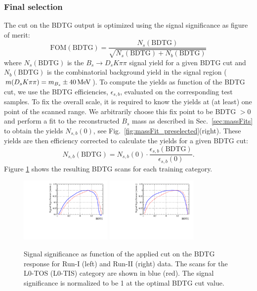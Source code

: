 \subsubsection{Final selection}

The cut on the BDTG output is optimized using the signal significance as figure of merit:
\begin{equation}
	\text{FOM}(\text{BDTG}) = \frac{N_s(\text{BDTG})}{\sqrt{N_s (\text{BDTG})+ N_b(\text{BDTG})}}
\end{equation}
where $N_{s}(\text{BDTG})$ is the $B_s \to D_s K \pi \pi$ signal yield for a given BDTG cut and $N_{b}(\text{BDTG})$ is the combinatorial background yield in the signal region ($m(D_sK\pi\pi) = m_{B_s} \pm 40 \mathrm{\,Me\kern -0.1em V}$).
To compute the yields as function of the BDTG cut, we use the BDTG efficiencies, $\epsilon_{s,b}$, evaluated on the corresponding test samples.
To fix the overall scale, it is required to know the yields at (at least) one point of the scanned range.
We arbitrarily choose this fix point to be BDTG $> 0$ and perform a fit to the reconstructed $B_s$ mass as described in Sec.~\ref{sec:massFits} to obtain the yields $N_{s,b}(0)$,
see Fig.~\ref{fig:massFit_preselected}(right).
These yields are then efficiency corrected to calculate the yields for a given BDTG cut: 
\begin{equation}
N_{s,b}(\text{BDTG}) = N_{s,b}(0) \cdot \frac{\epsilon_{s,b}(\text{BDTG})}{\epsilon_{s,b}(0)}.
\end{equation}
Figure \ref{fig:scanBDT} shows the resulting BDTG scans for each training category.
\begin{figure}[h]
\centering
\includegraphics[height=!,width=0.4\textwidth]{figs/TMVA/BDT_scan_Run1.pdf}
\includegraphics[height=!,width=0.4\textwidth]{figs/TMVA/BDT_scan_Run2.pdf}
\caption{Signal significance as function of the applied cut on the BDTG response for Run-I (left) and Run-II (right) data.
The scans for the \textsf{L0-TOS} (\textsf{L0-TIS}) category are shown in blue (red).
The signal significance is normalized to be 1 at the optimal BDTG cut value.
}
\label{fig:scanBDT}
\end{figure}


